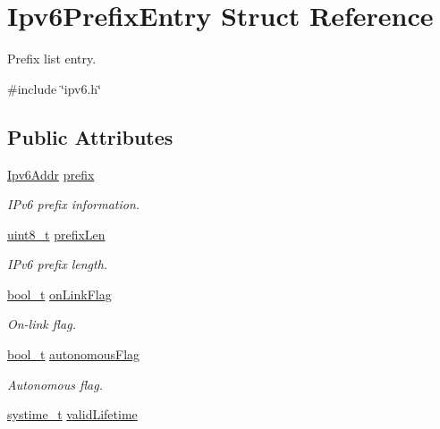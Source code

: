 \hypertarget{structIpv6PrefixEntry}{}\section{Ipv6\+Prefix\+Entry Struct Reference}
\label{structIpv6PrefixEntry}


Prefix list entry.  




{\ttfamily \#include \char`\"{}ipv6.\+h\char`\"{}}

\subsection*{Public Attributes}
\begin{DoxyCompactItemize}
\item 
\hyperlink{ipv6_8h_aed0cbc40c61ed5b4fb681ebc55237e89}{Ipv6\+Addr} \hyperlink{structIpv6PrefixEntry_ac8fdea2f9884d84f35af314249e47aa4}{prefix}
\begin{DoxyCompactList}\small\item\em I\+Pv6 prefix information. \end{DoxyCompactList}\item 
\hyperlink{stdint_8h_aba7bc1797add20fe3efdf37ced1182c5}{uint8\+\_\+t} \hyperlink{structIpv6PrefixEntry_a42ac450d305210faf002c0b59e0c9bc8}{prefix\+Len}
\begin{DoxyCompactList}\small\item\em I\+Pv6 prefix length. \end{DoxyCompactList}\item 
\hyperlink{compiler__port_8h_a812d16e5494522586b3784e55d479912}{bool\+\_\+t} \hyperlink{structIpv6PrefixEntry_a235114a9f36acb687819948f0b8cd581}{on\+Link\+Flag}
\begin{DoxyCompactList}\small\item\em On-\/link flag. \end{DoxyCompactList}\item 
\hyperlink{compiler__port_8h_a812d16e5494522586b3784e55d479912}{bool\+\_\+t} \hyperlink{structIpv6PrefixEntry_a072d6a4bd262b000583605778f913595}{autonomous\+Flag}
\begin{DoxyCompactList}\small\item\em Autonomous flag. \end{DoxyCompactList}\item 
\hyperlink{compiler__port_8h_ae3e32a98d431a02106616da3071832dd}{systime\+\_\+t} \hyperlink{structIpv6PrefixEntry_aa60a2863be803fd4a40d40443ecb96f8}{valid\+Lifetime}

\end{DoxyCompactItemize}
